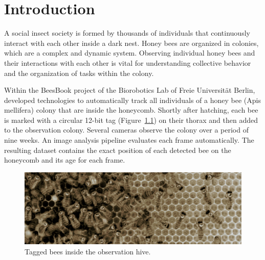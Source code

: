 \chapter{Introduction}
\label{ch:intro}

A social insect society is formed by thousands of individuals that continuously interact with each other inside a dark nest. 
Honey bees are organized in colonies, which are a complex and dynamic system.
Observing individual honey bees and their interactions with each other is vital for understanding collective behavior and the organization of tasks within the colony.

Within the BeesBook project of the Biorobotics Lab of Freie Universität Berlin, \textcite{wario2015automatic} developed technologies to automatically track all individuals of a honey bee (Apis mellifera) colony that are inside the honeycomb.
Shortly after hatching, each bee is marked with a circular 12-bit tag (Figure~\ref{fig:markers}) on their thorax and then added to the observation colony.
Several cameras observe the colony over a period of nine weeks. An image analysis pipeline evaluates each frame automatically. The resulting dataset contains the exact position of each detected bee on the honeycomb and its age for each frame.

\begin{figure}[b]
	\centering
	\includegraphics[width=1.0\textwidth]{Figures/markers}
	\caption{Tagged bees inside the observation hive.}
	\label{fig:markers}
\end{figure}

